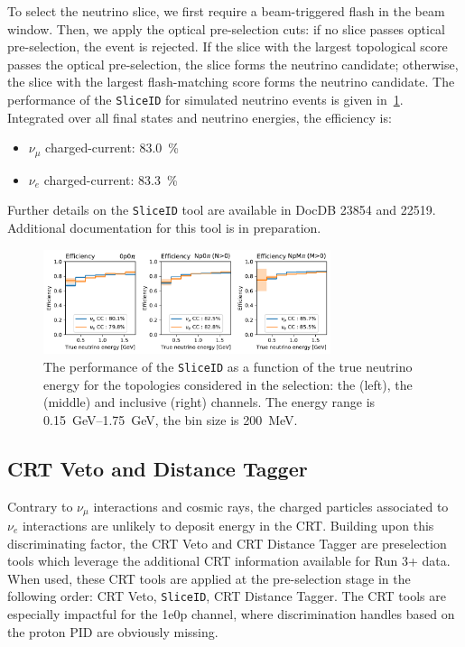 To select the neutrino slice, we first require a beam-triggered flash in the beam window. 
Then, we apply the optical pre-selection cuts: if no slice passes optical pre-selection, the event is rejected. 
If the slice with the largest topological score passes the optical pre-selection, the slice forms the neutrino candidate; otherwise, the slice with the largest flash-matching score forms the neutrino candidate.
The performance of the \texttt{SliceID} for simulated neutrino events is given in~\cref{fig:sliceid}.
Integrated over all final states and neutrino energies, the efficiency is:
\begin{itemize}
    \item $\nu_\mu$ charged-current: \SI{83.0}{\%}
    \item $\nu_e$ charged-current: \SI{83.3}{\%}
\end{itemize}
Further details on the \texttt{SliceID} tool are available in DocDB 23854 and 22519. Additional documentation for this tool is in preparation.



\begin{figure}[H]
    \centering
    \includegraphics[width=0.75\textwidth]{NuId-Ch3/Images/sliceID.pdf}
    \caption{The performance of the \texttt{SliceID} as a function of the true neutrino energy for the topologies considered in the \nuecc selection: the \zpsel (left), the  \npsel (middle) and inclusive (right) channels. The energy range is \SIrange{0.15}{1.75}{\GeV}, the bin size is \SI{200}{\MeV}.}
    \label{fig:sliceid}
\end{figure}



\subsection{CRT Veto and Distance Tagger}
\label{sec:sliceID:CRT}
Contrary to  $\nu_\mu$ interactions and cosmic rays, the charged particles associated to $\nu_e$ interactions are unlikely to deposit energy in the CRT. Building upon this discriminating factor, the CRT Veto and CRT Distance Tagger are preselection tools which leverage the additional CRT information available for Run 3+ data.
When used, these CRT tools are applied at the pre-selection stage in the following order: CRT Veto, \texttt{SliceID}, CRT Distance Tagger. The CRT tools are especially impactful for the 1e0p channel, where discrimination handles based on the proton PID are obviously missing. \\


